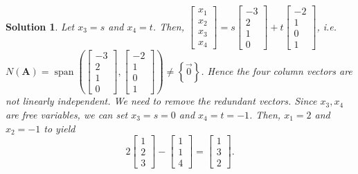 \documentclass[]{book}
\DeclareMathOperator{\vecspan}{span}
\newcommand{\vecxxxx}[1][x]{\ensuremath{\begin{bmatrix}
#1_1 \\
#1_2 \\
#1_3 \\
#1_4
\end{bmatrix}}}
\newcommand{\mat}[1]{\ensuremath{\mathbf{#1}}}
\newtheorem*{solution}{Solution}
\begin{document}
\begin{example}
\begin{solution}
    Let $x_3 = s$ and $x_4=t$. Then, $\vecxxxx = s\begin{bmatrix}-3 \\ 2 \\ 1 \\ 0\end{bmatrix} + t\begin{bmatrix}-2 \\ 1 \\ 0 \\ 1\end{bmatrix}$, i.e. $N(\mat{A})=\vecspan\left(\begin{bmatrix}-3 \\ 2 \\ 1 \\ 0\end{bmatrix}, \begin{bmatrix}-2 \\ 1 \\ 0 \\ 1\end{bmatrix}\right) \neq \left\{\vec{0}\right\}$. Hence the four column vectors are not linearly independent. We need to remove the redundant vectors. Since $x_3,x_4$ are free variables, we can set $x_3=s=0$ and $x_4=t=-1$. Then, $x_1=2$ and $x_2=-1$ to yield
    \[2\begin{bmatrix}1\\2\\3\end{bmatrix} - \begin{bmatrix}1\\1\\4\end{bmatrix} = \begin{bmatrix}1\\3\\2\end{bmatrix}.\]


\end{solution}
\end{example}
\end{document}
